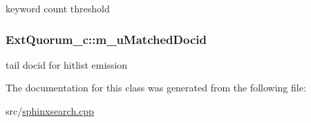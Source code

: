 keyword count threshold 

\hypertarget{classExtQuorum__c_a39c92bddc5e5b3851c65a6729457f252}{
\subsubsection[{m\-\_\-u\-Matched\-Docid}]{ Ext\-Quorum\-\_\-c\-::m\-\_\-u\-Matched\-Docid\hspace{0.3cm}{\ttfamily [private]}}}\label{classExtQuorum__c_a39c92bddc5e5b3851c65a6729457f252}


tail docid for hitlist emission 



The documentation for this class was generated from the following file\-:\begin{DoxyCompactItemize}
\item 
src/\hyperlink{sphinxsearch_8cpp}{sphinxsearch.\-cpp}\end{DoxyCompactItemize}
